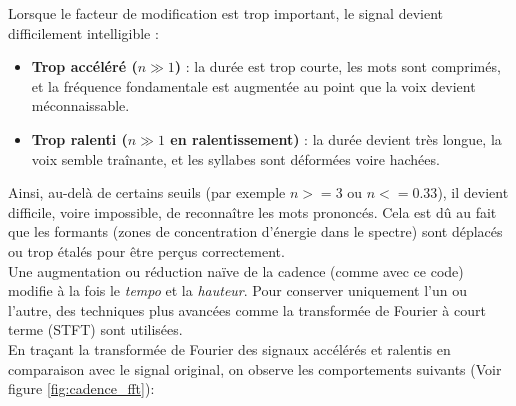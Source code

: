 Lorsque le facteur de modification est trop important, le signal devient difficilement intelligible :

\begin{itemize}
    \item \textbf{Trop accéléré ($n \gg 1$)} : la durée est trop courte, les mots sont comprimés, et la fréquence fondamentale est augmentée au point que la voix devient méconnaissable.
    \item \textbf{Trop ralenti ($n \gg 1$ en ralentissement)} : la durée devient très longue, la voix semble traînante, et les syllabes sont déformées voire hachées.
\end{itemize}

Ainsi, au-delà de certains seuils (par exemple $n >= 3$ ou $n <= 0.33$), il devient difficile, voire impossible, de reconnaître les mots prononcés. Cela est dû au fait que les formants (zones de concentration d’énergie dans le spectre) sont déplacés ou trop étalés pour être perçus correctement.\\

Une augmentation ou réduction naïve de la cadence (comme avec ce code) modifie à la fois le \textit{tempo} et la \textit{hauteur}. Pour conserver uniquement l’un ou l’autre, des techniques plus avancées comme la transformée de Fourier à court terme (STFT) sont utilisées.\\

En traçant la transformée de Fourier des signaux accélérés et ralentis en comparaison avec le signal original, on observe les comportements suivants (Voir figure \ref{fig:cadence_fft}):

